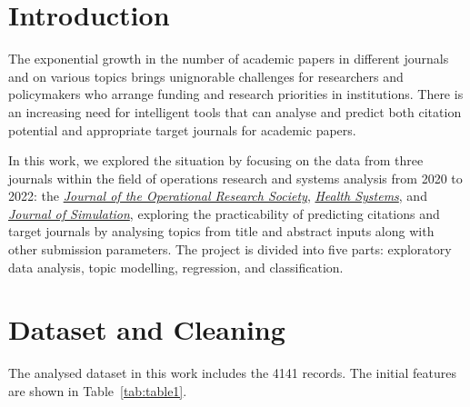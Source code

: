 \documentclass[9pt,twocolumn,twoside]{pnas-new}
\begin{document}


\maketitle
\thispagestyle{firststyle}

\section*{Introduction}

The exponential growth in the number of academic papers in different journals and on various topics brings unignorable challenges for researchers and policymakers who arrange funding and research priorities in institutions\cite{10.1162/qss_a_00327}. There is an increasing need for intelligent tools that can analyse and predict both citation potential and appropriate target journals for academic papers\cite{10.1002/asi.24810}. 


In this work, we explored the situation by focusing on the data from three journals within the field of operations research and systems analysis from 2020 to 2022: the \href{https://www.tandfonline.com/journals/tjor20}{\textit{Journal of the Operational Research Society}}, \href{https://www.tandfonline.com/journals/thss20}{\textit{Health Systems}}, and \href{https://www.tandfonline.com/journals/tjsm20}{\textit{Journal of Simulation}}, exploring the practicability of predicting citations and target journals by analysing topics from title and abstract inputs along with other submission parameters. The project is divided into five parts: exploratory data analysis, topic modelling, regression, and classification.



\section{Dataset and Cleaning}
The analysed dataset in this work includes the 4141 records. The initial features are shown in Table~\ref{tab:table1}.
\end{document}
